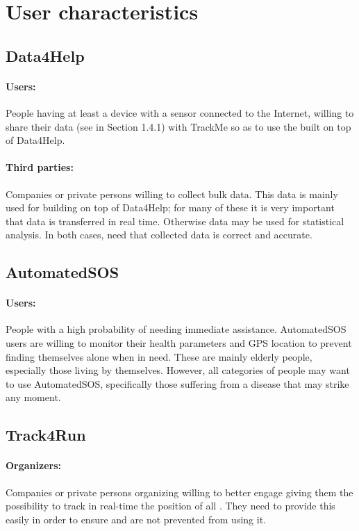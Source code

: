 \documentclass[../../rasd.tex]{subfiles}
\begin{document}
\section{User characteristics}
\subsection{Data4Help}
\paragraph{Users:}
	People having at least a device with a sensor connected to the Internet, willing to share their data (see  in Section 1.4.1) with TrackMe so as to use the  built on top of Data4Help.
\paragraph{Third parties:}
	Companies or private persons willing to collect bulk data. This data is mainly used for building  on top of Data4Help; for many of these  it is very important that data is transferred in real time. Otherwise data may be used for statistical analysis. In both cases,  need that collected data is correct and accurate.

\subsection{AutomatedSOS}
\paragraph{Users:}
	People with a high probability of needing immediate assistance. AutomatedSOS users are willing to monitor their health parameters and GPS location to prevent finding themselves alone when in need. These are mainly elderly people, especially those living by themselves. However, all categories of people may want to use AutomatedSOS, specifically those suffering from a disease that may strike any moment.

\subsection{Track4Run}
\paragraph{Organizers:}
	Companies or private persons organizing  willing to better engage  giving them the possibility to track in real-time the position of all . They need to provide this  easily in order to ensure  and  are not prevented from using it.
\end{document}
